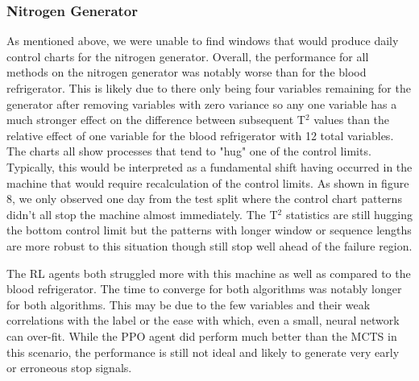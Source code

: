 \documentclass[12pt]{article}
\begin{document}
\subsubsection{Nitrogen Generator}

As mentioned above, we were unable to find windows that would produce daily control charts for the nitrogen generator. Overall, the performance for all methods on the nitrogen generator was notably worse than for the blood refrigerator. This is
likely due to there only being four variables remaining for the generator after removing variables with zero variance so any one variable has a much stronger effect on the difference between subsequent T$^2$ values than the relative effect of one
variable for the blood refrigerator with 12 total variables. The charts all show processes that tend to "hug" one of the control limits. Typically, this would be interpreted as a fundamental shift having occurred in the machine that would require
recalculation of the control limits. As shown in figure 8, we only observed one day from the test split where the control chart patterns didn't all stop the machine almost immediately. The T$^2$ statistics are still hugging the bottom control limit but the patterns with
longer window or sequence lengths are more robust to this situation though still stop well ahead of the failure region.

The RL agents both struggled more with this machine as well as compared to the blood refrigerator. The time to converge for both algorithms was notably longer for both algorithms. This may be due to the few variables and their weak correlations with
the label or the ease with which, even a small, neural network can over-fit. While the PPO agent did perform much better than the MCTS in this scenario, the performance is still not ideal and likely to generate very early or erroneous stop signals.
\end{document}
